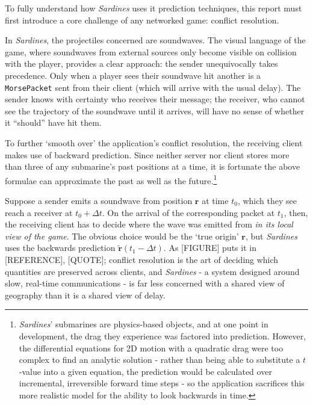 \documentclass[a4paper, 9pt]{article}
\begin{document}
\begin{flushleft}
To fully understand how \textit{Sardines} uses it prediction techniques, this report must first introduce a core challenge of any networked game: conflict resolution.

\vspace{5pt}\noindent
In \textit{Sardines}, the projectiles concerned are soundwaves. The visual language of the game, where soundwaves from external sources only become visible on collision with the player, provides a clear approach: the sender unequivocally takes precedence. Only when a player sees their soundwave hit another is a \texttt{MorsePacket} sent from their client (which will arrive with the usual delay). The sender knows with certainty who receives their message; the receiver, who cannot see the trajectory of the soundwave until it arrives, will have no sense of whether it ``should'' have hit them.

\vspace{5pt}\noindent
To further `smooth over' the application's conflict resolution, the receiving client makes use of backward prediction. Since neither server nor client stores more than three of any submarine's past positions at a time, it is fortunate the above formulae can approximate the past as well as the future.\footnote{\textit{Sardines}' submarines are physics-based objects, and at one point in development, the drag they experience was factored into prediction. However, the differential equations for 2D motion with a quadratic drag were too complex to find an analytic solution - rather than being able to substitute a $t$-value into a given equation, the prediction would be calculated over incremental, irreversible forward time steps - so the application sacrifices this more realistic model for the ability to look backwards in time.}

\vspace{5pt}\noindent
Suppose a sender emits a soundwave from position $\mathbf{r}$ at time $t_0$, which they see reach a receiver at $t_0+\Delta t$. On the arrival of the corresponding packet at $t_1$, then, the receiving client has to decide where the wave was emitted from \textit{in its local view of the game}. The obvious choice would be the `true origin' $\mathbf{r}$, but \textit{Sardines} uses the backwards prediction $\mathbf{\tilde{r}}(t_1-\Delta t)$. As [FIGURE] puts it in [REFERENCE], [QUOTE]; conflict resolution is the art of deciding which quantities are preserved across clients, and \textit{Sardines} - a system designed around slow, real-time communications - is far less concerned with a shared view of geography than it is a shared view of delay.


\end{flushleft}
\end{document}
